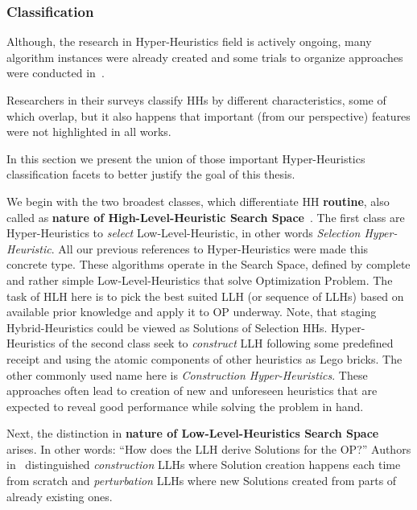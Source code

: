 \subsubsection{Classification}
Although, the research in Hyper-Heuristics field is actively ongoing, many algorithm instances were already created and some trials to organize approaches were conducted in~\cite{ryser2014review,drake2019recent,burke2019classification}.

Researchers in their surveys classify HHs by different characteristics, some of which overlap, but it also happens that important (from our perspective) features were not highlighted in all works. 

In this section we present the union of those important Hyper-Heuristics classification facets to better justify the goal of this thesis.

We begin with the two broadest classes, which differentiate HH \textbf{routine}, also called as \textbf{nature of High-Level-Heuristic Search Space}~\cite{burke2013hyper,burke2019classification,drake2019recent}.
The first class are Hyper-Heuristics to \textit{select} Low-Level-Heuristic, in other words \textit{Selection Hyper-Heuristic}. All our previous references to Hyper-Heuristics were made this concrete type. These algorithms operate in the Search Space, defined by complete and rather simple Low-Level-Heuristics that solve Optimization Problem. The task of HLH here is to pick the best suited LLH (or sequence of LLHs) based on available prior knowledge and apply it to OP underway. Note, that staging Hybrid-Heuristics could be viewed as Solutions of Selection HHs.
Hyper-Heuristics of the second class seek to \textit{construct} LLH following some predefined receipt and using the atomic components of other heuristics as Lego bricks. The other commonly used name here is \textit{Construction Hyper-Heuristics}. These approaches often lead to creation of new and unforeseen heuristics that are expected to reveal good performance while solving the problem in hand.

Next, the distinction in \textbf{nature of Low-Level-Heuristics Search Space} arises. 
In other words: ``How does the LLH derive Solutions for the OP?'' Authors in~\cite{burke2013hyper,burke2019classification,drake2019recent} distinguished \textit{construction} LLHs where Solution creation happens each time from scratch and \textit{perturbation} LLHs where new Solutions created from parts of already existing ones.

